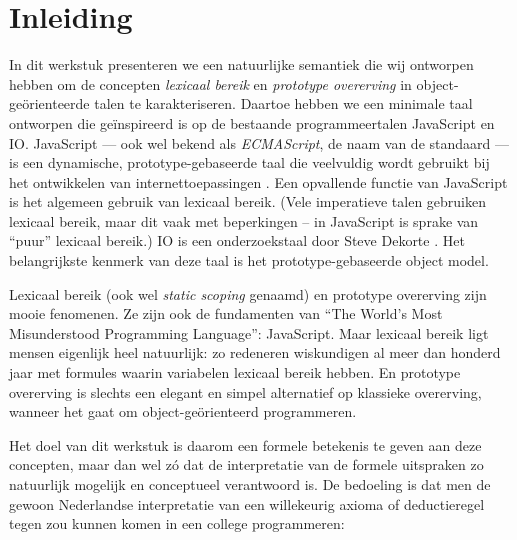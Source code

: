 
\chapter{Inleiding}

In dit werkstuk presenteren we een natuurlijke semantiek die wij ontworpen hebben om de concepten \emph{lexicaal bereik} en \emph{prototype overerving} in object-geörienteerde talen te karakteriseren. Daartoe hebben we een minimale taal ontworpen die geïnspireerd is op de bestaande programmeertalen JavaScript en IO. JavaScript --- ook wel bekend als \emph{ECMAScript}, de naam van de standaard --- is een dynamische, prototype-gebaseerde taal die veelvuldig wordt gebruikt bij het ontwikkelen van internettoepassingen \citep{javascript}. Een opvallende functie van JavaScript is het algemeen gebruik van lexicaal bereik. (Vele imperatieve talen gebruiken lexicaal bereik, maar dit vaak met beperkingen -- in JavaScript is sprake van ``puur'' lexicaal bereik.) IO is een onderzoekstaal door Steve Dekorte \citep{io}. Het belangrijkste kenmerk van deze taal is het prototype-gebaseerde object model.

Lexicaal bereik (ook wel \emph{static scoping} genaamd) en prototype overerving zijn mooie fenomenen. Ze zijn ook de fundamenten van “The World's Most Misunderstood Programming Language”: JavaScript. Maar lexicaal bereik ligt mensen eigenlijk heel natuurlijk: zo redeneren wiskundigen al meer dan honderd jaar met formules waarin variabelen lexicaal bereik hebben. En prototype overerving is slechts een elegant en simpel alternatief op klassieke overerving, wanneer het gaat om object-geörienteerd programmeren.

Het doel van dit werkstuk is daarom een formele betekenis te geven aan deze concepten, maar dan wel zó dat de interpretatie van de formele uitspraken zo natuurlijk mogelijk en conceptueel verantwoord is. De bedoeling is dat men de gewoon Nederlandse interpretatie van een willekeurig axioma of deductieregel tegen zou kunnen komen in een college programmeren:

